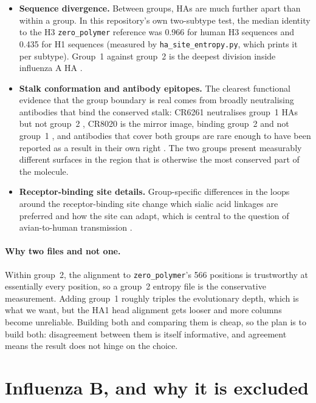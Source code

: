\documentclass[11pt,a4paper]{article}
\newcommand{\file}[1]{\texttt{#1}}
\begin{document}
\begin{itemize}
  \item \textbf{Sequence divergence.} Between groups, HAs are much further
    apart than within a group. In this repository's own two-subtype test, the
    median identity to the H3 \file{zero\_polymer} reference was 0.966 for human
    H3 sequences and 0.435 for H1 sequences (measured by
    \file{ha\_site\_entropy.py}, which prints it per subtype). Group~1 against
    group~2 is the deepest division inside influenza A HA
    \cite{air1981,nobusawa1991}.
  \item \textbf{Stalk conformation and antibody epitopes.} The clearest
    functional evidence that the group boundary is real comes from broadly
    neutralising antibodies that bind the conserved stalk: CR6261 neutralises
    group~1 HAs but not group~2 \cite{ekiert2009}, CR8020 is the mirror image,
    binding group~2 and not group~1 \cite{ekiert2011}, and antibodies that cover
    both groups are rare enough to have been reported as a result in their own
    right \cite{corti2011}. The two groups present measurably different
    surfaces in the region that is otherwise the most conserved part of the
    molecule.
  \item \textbf{Receptor-binding site details.} Group-specific differences in
    the loops around the receptor-binding site change which sialic acid linkages
    are preferred and how the site can adapt, which is central to the question
    of avian-to-human transmission \cite{russell2004,skehel2000}.
\end{itemize}

\paragraph{Why two files and not one.}
Within group~2, the alignment to \file{zero\_polymer}'s 566 positions is
trustworthy at essentially every position, so a group~2 entropy file is the
conservative measurement. Adding group~1 roughly triples the evolutionary depth,
which is what we want, but the HA1 head alignment gets looser and more columns
become unreliable. Building both and comparing them is cheap, so the plan is to
build both: disagreement between them is itself informative, and agreement means
the result does not hinge on the choice.

\section{Influenza B, and why it is excluded}
\end{document}
